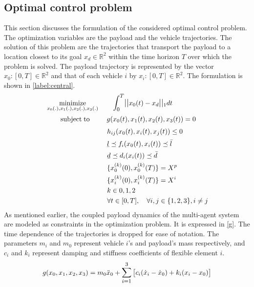 \documentclass[letterpaper, 10 pt, conference]{ieeeconf}
\newcommand{\ubar}[1]{\text{\b{$#1$}}}
\DeclareMathOperator*{\minimize}{minimize}
\DeclareMathOperator*{\subj}{subject\;to}
\begin{document}
\subsection{Optimal control problem}
This section discusses the formulation of the considered optimal control problem. The optimization variables are the payload and the vehicle trajectories. The solution of this problem are the trajectories that transport the payload to a location closest to its goal $x_d \in \mathbb{R}^2$ within the time horizon $T$ over which the problem is solved.
The payload trajectory is represented by the vector ${x_0:[0,T] \in \mathbb{R}^2}$ and that of each vehicle $i$ by ${x_i:[0,T] \in \mathbb{R}^2}$.
 The formulation is shown in \eqref{label:central}.
\begin{equation}
  \label{label:central}
  \begin{aligned}
    & \minimize_{x_0(.),x_1(.),x_2(.),x_3(.)} \qquad \mathlarger{\int_0^T} \mathlarger{||}x_0(t)-x_d\mathlarger{||}_1 dt \\
    & \qquad \subj
     \qquad \text{  } g(x_0(t),x_1(t),x_2(t),x_3(t)) = 0 \\
    &	\qquad  \qquad \qquad \quad \quad \quad h_{ij}(x_0(t),x_i(t),x_j(t)) \leq 0 \\
    &	\qquad  \qquad \qquad \quad \quad \quad \ubar{l} \preceq f_i(x_0(t),x_i(t)) \preceq \bar{l}\\   
    &	\qquad  \qquad \qquad \quad \quad \quad \ubar{d} \preceq d_i(x_i(t)) \preceq \bar{d} \\
    &	\qquad  \qquad \qquad \quad \quad \quad \{x_0^{(k)}(0), x_0^{(k)}(T)\}  = X^p \\
      &	\qquad  \qquad \qquad \quad \quad \quad \{x_i^{(k)}(0), x_i^{(k)}(T)\}  = X^i \\
       &	 \qquad \qquad \qquad \quad \quad \quad k\in{0,1,2} \\
    &	 \qquad \qquad \qquad \quad \quad \quad \forall t \in [0,T], \quad \forall i,j \in \{1,2,3\}, i \neq j
  \end{aligned}
\end{equation}
As mentioned earlier, the coupled payload dynamics of the multi-agent system are modeled as constraints in the optimization problem. It is expressed in \eqref{g}. The time dependence of the trajectories is dropped for ease of notation. The parameters $m_i$ and $m_0$ represent vehicle $i$'s and payload's mass respectively, and $c_i$ and $k_i$ represent damping and stiffness coefficients of flexible element $i$. 
\begin{equation}\label{g}
\begin{aligned}
g(x_0,x_1,x_2,x_3) &= m_0\ddot{x}_0 +  \mathlarger{\sum\limits_{i=1}^{3}}
\begin{bmatrix}{c_i(\dot{x}_i-\dot{x}_0) + k_i(x_i - x_0)} \end{bmatrix}\\
\end{aligned}
\end{equation}
\end{document}

